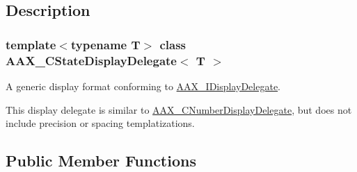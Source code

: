 \subsection{Description}
\subsubsection*{template$<$typename T$>$\newline
class A\+A\+X\+\_\+\+C\+State\+Display\+Delegate$<$ T $>$}

A generic display format conforming to \mbox{\hyperlink{a01801}{A\+A\+X\+\_\+\+I\+Display\+Delegate}}. 

This display delegate is similar to \mbox{\hyperlink{a01509}{A\+A\+X\+\_\+\+C\+Number\+Display\+Delegate}}, but does not include precision or spacing templatizations. \subsection*{Public Member Functions}
